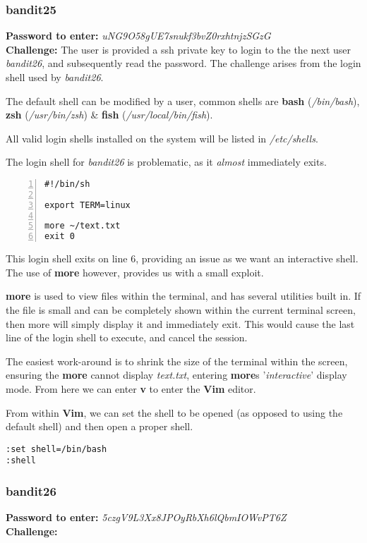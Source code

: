 \documentclass[a4paper]{article}
\newcommand{\pass}[1]{\textbf{Password to enter:} \textit{#1}\\}
\newcommand{\chall}{\textbf{Challenge:} }
\begin{document}
\subsubsection{bandit25}
\pass{uNG9O58gUE7snukf3bvZ0rxhtnjzSGzG}
\chall The user is provided a ssh private key to login to the the next user \textit{bandit26}, and subsequently read the password. The challenge arises from the login shell used by \textit{bandit26}.

The default shell can be modified by a user, common shells are \textbf{bash}  (\textit{/bin/bash}), \textbf{zsh} (\textit{/usr/bin/zsh}) \& \textbf{fish} (\textit{/usr/local/bin/fish}).

All valid login shells installed on the system will be listed in \textit{/etc/shells}.

The login shell for \textit{bandit26} is problematic, as it \textit{almost} immediately exits.
\begin{lstlisting}[title=login shell for bandit26\, /usr/bin/showtext, numbers=left]
#!/bin/sh

export TERM=linux

more ~/text.txt
exit 0
\end{lstlisting}

This login shell exits on line 6, providing an issue as we want an interactive shell. The use of \textbf{more} however, provides us with a small exploit.

\textbf{more} is used to view files within the terminal, and has several utilities built in. If the file is small and can be completely shown within the current terminal screen, then more will simply display it and immediately exit. This would cause the last line of the login shell to execute, and cancel the session.

The easiest work-around is to shrink the size of the terminal within the screen, ensuring the \textbf{more} cannot display \textit{text.txt}, entering \textbf{more}s '\textit{interactive}' display mode. From here we can enter \textbf{v} to enter the \textbf{Vim} editor.

From within \textbf{Vim}, we can set the shell to be opened (as opposed to using the default shell) and then open a proper shell.
\begin{lstlisting}[title=How to start a specific shell from vim, deletekeywords={set}]
:set shell=/bin/bash
:shell
\end{lstlisting}

\subsubsection{bandit26}
\pass{5czgV9L3Xx8JPOyRbXh6lQbmIOWvPT6Z}
\chall
\begin{lstlisting}
\end{lstlisting}
\end{document}
